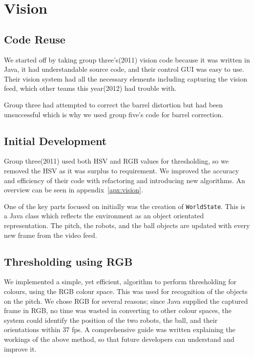 \section{Vision}

\subsection{Code Reuse}

We started off by taking group three's(2011) vision code because it was written
in Java, it had understandable source code, and their control GUI was easy to
use. Their vision system had all the necessary elements including capturing the
vision feed, which other teams this year(2012) had trouble with.  

Group three had attempted to correct the barrel distortion but had been
unsuccessful which is why we used group five's code for barrel correction.

\subsection{Initial Development}

Group three(2011) used both HSV and RGB values for thresholding, so we removed
the HSV as it was surplus to requirement. We improved the accuracy and
efficiency of their code with refactoring and introducing new algorithms. An
overview can be seen in appendix~\ref{apx:vision}.

One of the key parts focused on initially was the creation of
\texttt{WorldState}. This is a Java class which reflects the environment as an
object orientated representation. The pitch, the robots, and the ball objects
are updated with every new frame from the video feed.

\subsection{Thresholding using RGB} \label{sec:thresh}

We implemented a simple, yet efficient, algorithm to perform thresholding for
colours, using the RGB colour space. This was used for recognition of the
objects on the pitch. We chose RGB for several reasons; since Java supplied the
captured frame in RGB, no time was wasted in converting to other colour spaces,
the system could identify the position of the two robots, the ball, and their
orientations within 37 fps. A comprehensive guide was written explaining the
workings of the above method, so that future developers can understand and
improve it.

